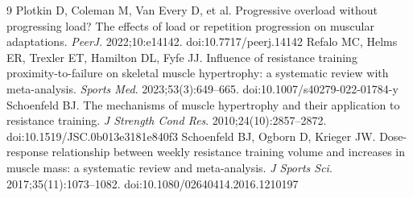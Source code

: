 \documentclass[11pt,a4paper]{article}
\begin{document}
\begin{thebibliography}{9}
 Plotkin D, Coleman M, Van Every D, et al. Progressive overload without progressing load? The effects of load or repetition progression on muscular adaptations. \emph{PeerJ}. 2022;10:e14142. doi:10.7717/peerj.14142
 Refalo MC, Helms ER, Trexler ET, Hamilton DL, Fyfe JJ. Influence of resistance training proximity-to-failure on skeletal muscle hypertrophy: a systematic review with meta-analysis. \emph{Sports Med}. 2023;53(3):649--665. doi:10.1007/s40279-022-01784-y
 Schoenfeld BJ. The mechanisms of muscle hypertrophy and their application to resistance training. \emph{J Strength Cond Res}. 2010;24(10):2857--2872. doi:10.1519/JSC.0b013e3181e840f3
 Schoenfeld BJ, Ogborn D, Krieger JW. Dose-response relationship between weekly resistance training volume and increases in muscle mass: a systematic review and meta-analysis. \emph{J Sports Sci}. 2017;35(11):1073--1082. doi:10.1080/02640414.2016.1210197
\end{thebibliography}

\appendix
\end{document}
